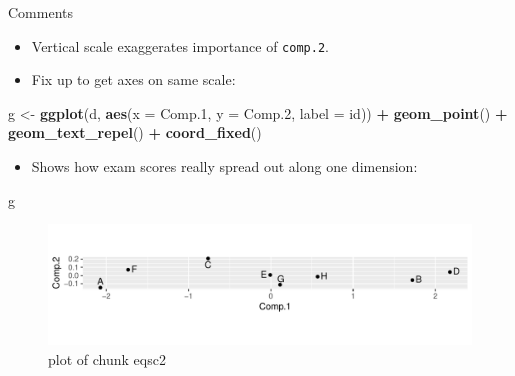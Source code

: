 \documentclass[ignorenonframetext,]{beamer}
\newenvironment{Shaded}{\begin{snugshade}}{\end{snugshade}}
\newcommand{\DataTypeTok}[1]{\textcolor[rgb]{0.13,0.29,0.53}{#1}}
\newcommand{\FloatTok}[1]{\textcolor[rgb]{0.00,0.00,0.81}{#1}}
\newcommand{\KeywordTok}[1]{\textcolor[rgb]{0.13,0.29,0.53}{\textbf{#1}}}
\newcommand{\NormalTok}[1]{#1}
\newcommand{\OperatorTok}[1]{\textcolor[rgb]{0.81,0.36,0.00}{\textbf{#1}}}
\newcommand{\StringTok}[1]{\textcolor[rgb]{0.31,0.60,0.02}{#1}}
\providecommand{\tightlist}{%
  \setlength{\itemsep}{0pt}\setlength{\parskip}{0pt}}
\begin{document}
\begin{frame}[fragile]{Comments}
\protect\hypertarget{comments-24}{}

\begin{itemize}
\item
  Vertical scale exaggerates importance of \texttt{comp.2}.
\item
  Fix up to get axes on same scale:
\end{itemize}

\begin{Shaded}
\begin{Highlighting}[]
\NormalTok{g <-}\StringTok{ }\KeywordTok{ggplot}\NormalTok{(d, }\KeywordTok{aes}\NormalTok{(}\DataTypeTok{x =}\NormalTok{ Comp}\FloatTok{.1}\NormalTok{, }\DataTypeTok{y =}\NormalTok{ Comp}\FloatTok{.2}\NormalTok{, }\DataTypeTok{label =}\NormalTok{ id)) }\OperatorTok{+}
\StringTok{  }\KeywordTok{geom_point}\NormalTok{() }\OperatorTok{+}\StringTok{ }\KeywordTok{geom_text_repel}\NormalTok{() }\OperatorTok{+}
\StringTok{  }\KeywordTok{coord_fixed}\NormalTok{()}
\end{Highlighting}
\end{Shaded}

\begin{itemize}
\tightlist
\item
  Shows how exam scores really spread out along one dimension:
\end{itemize}

\begin{Shaded}
\begin{Highlighting}[]
\NormalTok{g}
\end{Highlighting}
\end{Shaded}

\begin{figure}
\centering
\includegraphics{figure/eqsc2-1.pdf}
\caption{plot of chunk eqsc2}
\end{figure}

\end{frame}
\end{document}
